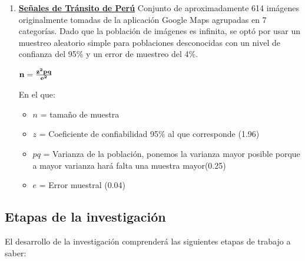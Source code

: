 		
		\begin{enumerate}
			\item[]  {\bf \underline {Señales de Tránsito de Perú}}\newline
			Conjunto de aproximadamente 614 imágenes originalmente tomadas de la aplicación Google Maps agrupadas en 7 categorías. Dado que la población de imágenes es infinita, se optó por usar un muestreo aleatorio simple para poblaciones desconocidas con un nivel de confianza del 95\% y un error de muestreo del 4\%.
		
			\vskip 0.4cm
			\begingroup\makeatletter{}\check@mathfonts
			\begin{center}
				${\bf n} ={\bf \frac{z^2pq}{e^2}}$
			\end{center}
			\endgroup
		
			En el que:\vskip 0.1cm
			\begin{itemize}
				\item $n$ = tamaño de muestra
				\item $z$ = Coeficiente de confiabilidad 95\% al que corresponde (1.96)
				\item $pq$ = Varianza de la población, ponemos la varianza mayor posible porque a mayor varianza hará falta una muestra mayor(0.25)
				\item $e$ = Error muestral (0.04)
			\end{itemize}
		\end{enumerate}

\subsection{Etapas de la investigación} 
	El desarrollo de la investigación comprenderá las siguientes etapas de trabajo a saber:

